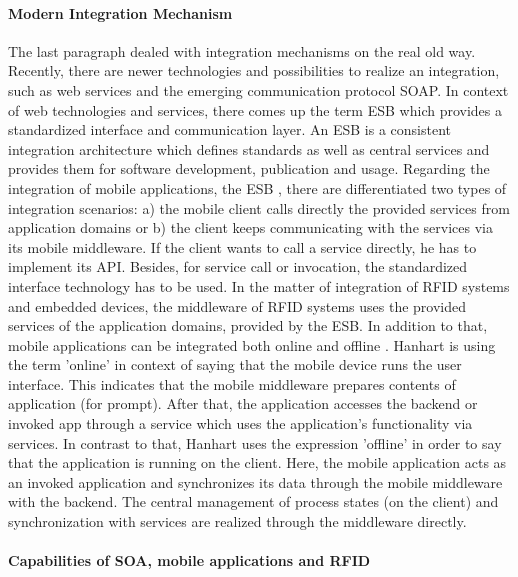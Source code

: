 \paragraph{Modern Integration Mechanism}

The last paragraph dealed with integration mechanisms on the real old way. Recently, there are newer technologies and possibilities to realize an integration, such as web services and the emerging communication protocol \ac{SOAP}. In context of web technologies and services, there comes up the term \ac{ESB} \cite[p.141 ff.]{mobile} which provides a standardized interface and communication layer. An ESB is a consistent integration architecture which defines standards as well as central services and provides them for software development, publication and usage. Regarding the integration of mobile applications, the ESB \cite[p.143]{mobile}, there are differentiated two types of integration scenarios: a) the mobile client calls directly the provided services from application domains or b) the client keeps communicating with the services via its mobile middleware. If the client wants to call a service directly, he has to implement its \ac{API}. Besides, for service call or invocation, the standardized interface technology has to be used.
In the matter of integration of RFID systems and embedded devices, the middleware of RFID systems uses the provided services of the application domains, provided by the ESB. In addition to that, mobile applications can be integrated both online and offline \cite[p.146 ff.]{mobile}. Hanhart is using the term 'online' in context of saying that the mobile device runs the user interface. This indicates that the mobile middleware prepares contents of application (for prompt). After that, the application accesses the backend or invoked app through a service which uses the application's functionality via services. In contrast to that, Hanhart uses the expression 'offline' in order to say that the application is running on the client. Here, the mobile application acts as an invoked application and synchronizes its data through the mobile middleware with the backend. The central management of process states (on the client) and synchronization with services are realized through the middleware directly.

\paragraph{Capabilities of SOA, mobile applications and RFID}

